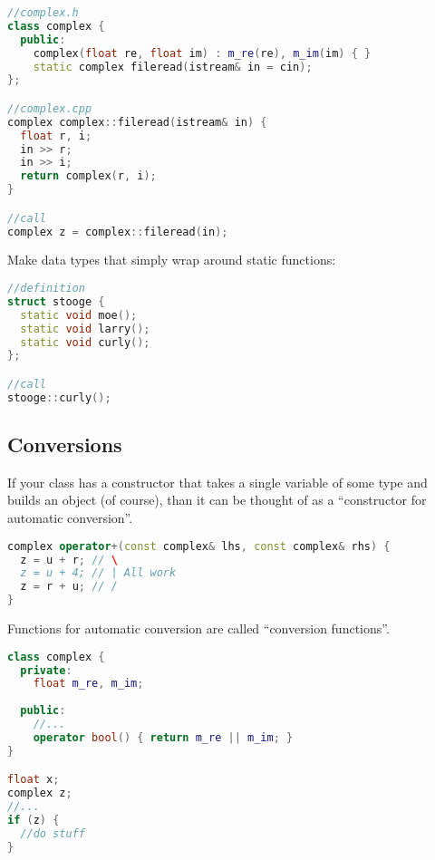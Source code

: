 \begin{lstlisting}[language=C++]
//complex.h
class complex {
  public:
    complex(float re, float im) : m_re(re), m_im(im) { }
    static complex fileread(istream& in = cin);
}; 

//complex.cpp
complex complex::fileread(istream& in) {
  float r, i;
  in >> r;
  in >> i;
  return complex(r, i);
}

//call
complex z = complex::fileread(in);
\end{lstlisting}

Make data types that simply wrap around static functions:

\begin{lstlisting}[language=C++]
//definition
struct stooge {
  static void moe();
  static void larry();
  static void curly();
};

//call
stooge::curly();
\end{lstlisting}


\subsection{Conversions}

If your class has a constructor that takes a single variable of some type and builds an object (of course), than it can be thought of as a ``constructor for automatic conversion''. 

\begin{lstlisting}[language=C++]
complex operator+(const complex& lhs, const complex& rhs) {
  z = u + r; // \
  z = u + 4; // | All work
  z = r + u; // /
}
\end{lstlisting}

Functions for automatic conversion are called ``conversion functions''.

\begin{lstlisting}[language=C++]
class complex {
  private:
    float m_re, m_im;
  
  public:
    //...
    operator bool() { return m_re || m_im; }
}

float x;
complex z;
//...
if (z) {
  //do stuff
}
\end{lstlisting}
